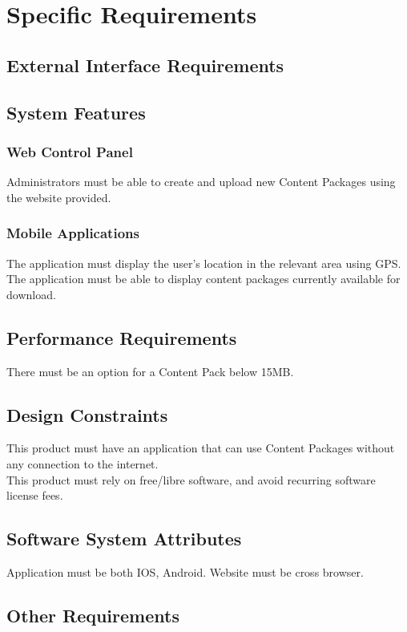 \documentclass[letterpaper, 10pt,titlepage]{article}
\begin{document}
\section{Specific Requirements}
\subsection{External Interface Requirements}
\subsection{System Features}
\subsubsection{Web Control Panel}
Administrators must be able to create and upload new Content Packages using the website provided.
\subsubsection{Mobile Applications}
The application must display the user's location in the relevant area using GPS.\\
The application must be able to display content packages currently available for download.

\subsection{Performance Requirements}
There must be an option for a Content Pack below 15MB. 

\subsection{Design Constraints}
This product must have an application that can use Content Packages without any connection to the internet.\\
This product must rely on free/libre software, and avoid recurring software license fees.

\subsection{Software System Attributes}
Application must be both IOS, Android. Website must be cross browser.

\subsection{Other Requirements}
\vspace{0.5cm}
\end{document}
